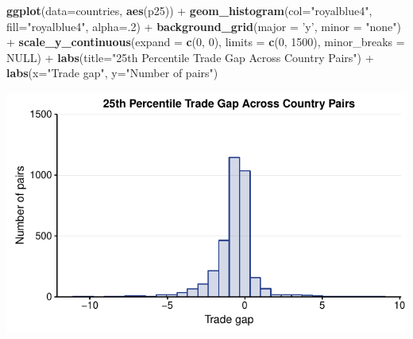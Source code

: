 \documentclass[10pt,]{article}
\newenvironment{Shaded}{\begin{snugshade}}{\end{snugshade}}
\newcommand{\KeywordTok}[1]{\textcolor[rgb]{0.13,0.29,0.53}{\textbf{{#1}}}}
\newcommand{\DataTypeTok}[1]{\textcolor[rgb]{0.13,0.29,0.53}{{#1}}}
\newcommand{\DecValTok}[1]{\textcolor[rgb]{0.00,0.00,0.81}{{#1}}}
\newcommand{\StringTok}[1]{\textcolor[rgb]{0.31,0.60,0.02}{{#1}}}
\newcommand{\OtherTok}[1]{\textcolor[rgb]{0.56,0.35,0.01}{{#1}}}
\newcommand{\NormalTok}[1]{{#1}}
\begin{document}
\begin{Shaded}
\begin{Highlighting}[]
\KeywordTok{ggplot}\NormalTok{(}\DataTypeTok{data=}\NormalTok{countries, }\KeywordTok{aes}\NormalTok{(p25)) +}
\StringTok{  }\KeywordTok{geom_histogram}\NormalTok{(}\DataTypeTok{col=}\StringTok{"royalblue4"}\NormalTok{,}
                 \DataTypeTok{fill=}\StringTok{"royalblue4"}\NormalTok{,}
                 \DataTypeTok{alpha=}\NormalTok{.}\DecValTok{2}\NormalTok{) +}
\StringTok{  }\KeywordTok{background_grid}\NormalTok{(}\DataTypeTok{major =} \StringTok{'y'}\NormalTok{, }\DataTypeTok{minor =} \StringTok{"none"}\NormalTok{) +}
\StringTok{  }\KeywordTok{scale_y_continuous}\NormalTok{(}\DataTypeTok{expand =} \KeywordTok{c}\NormalTok{(}\DecValTok{0}\NormalTok{, }\DecValTok{0}\NormalTok{), }\DataTypeTok{limits =} \KeywordTok{c}\NormalTok{(}\DecValTok{0}\NormalTok{, }\DecValTok{1500}\NormalTok{),  }\DataTypeTok{minor_breaks =} \OtherTok{NULL}\NormalTok{) +}
\StringTok{  }\KeywordTok{labs}\NormalTok{(}\DataTypeTok{title=}\StringTok{"25th Percentile Trade Gap Across Country Pairs"}\NormalTok{) +}
\StringTok{  }\KeywordTok{labs}\NormalTok{(}\DataTypeTok{x=}\StringTok{"Trade gap"}\NormalTok{, }\DataTypeTok{y=}\StringTok{"Number of pairs"}\NormalTok{)}
\end{Highlighting}
\end{Shaded}

\begin{center}\includegraphics{Figs/value_pairs-3} \end{center}
\end{document}
